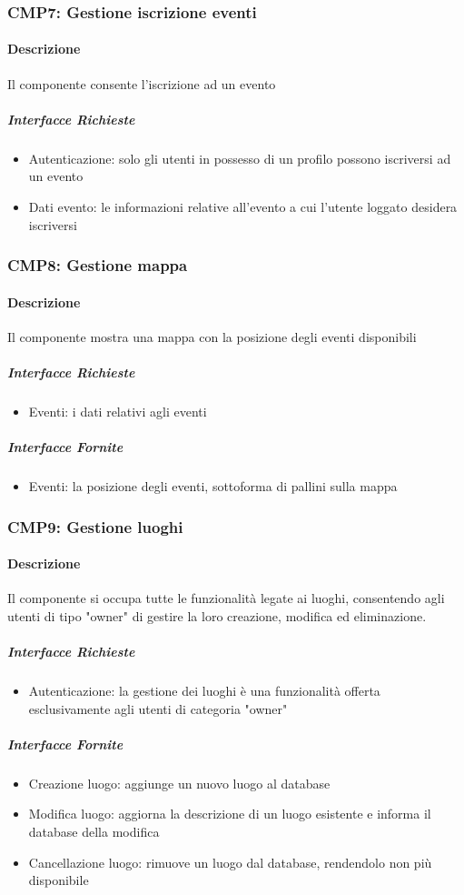 \documentclass[9pt]{extarticle}
\begin{document}
\subsubsection*{CMP7: Gestione iscrizione eventi}
\paragraph{Descrizione}
Il componente consente l'iscrizione ad un evento
\subparagraph{Interfacce Richieste}
\begin{itemize}
	\item Autenticazione: solo gli utenti in possesso di un profilo possono iscriversi ad un evento
	\item Dati evento: le informazioni relative all'evento a cui l'utente loggato desidera iscriversi
\end{itemize}

\subsubsection*{CMP8: Gestione mappa}
\paragraph{Descrizione}
Il componente mostra una mappa con la posizione degli eventi disponibili
\subparagraph{Interfacce Richieste}
\begin{itemize}
	\item Eventi: i dati relativi agli eventi
\end{itemize}
\subparagraph{Interfacce Fornite}
\begin{itemize}
	\item Eventi: la posizione degli eventi, sottoforma di pallini sulla mappa
\end{itemize}

\subsubsection*{CMP9: Gestione luoghi}
\paragraph{Descrizione}
Il componente si occupa tutte le funzionalità legate ai luoghi, consentendo agli utenti di tipo "owner" di gestire la loro creazione, modifica ed eliminazione.
\subparagraph{Interfacce Richieste}
\begin{itemize}
	\item Autenticazione: la gestione dei luoghi è una funzionalità offerta esclusivamente agli utenti di categoria "owner"
\end{itemize}
\subparagraph{Interfacce Fornite}
\begin{itemize}
	\item Creazione luogo: aggiunge un nuovo luogo al database
	\item Modifica luogo: aggiorna la descrizione di un luogo esistente e informa il database della modifica
	\item Cancellazione luogo: rimuove un luogo dal database, rendendolo non più disponibile
\end{itemize}
\end{document}
